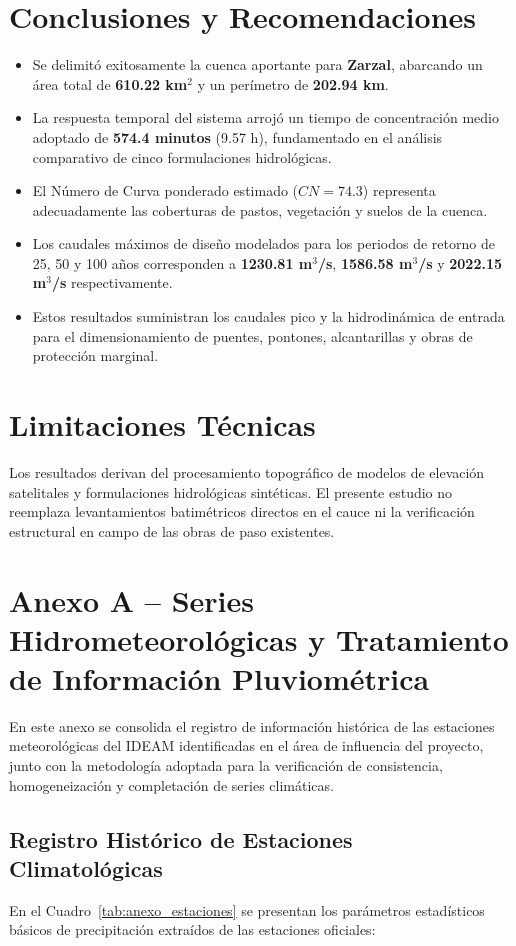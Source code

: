 \documentclass[11pt,a4paper]{article}
\begin{document}
\section{Conclusiones y Recomendaciones}
\begin{itemize}
\item Se delimitó exitosamente la cuenca aportante para \textbf{Zarzal}, abarcando un área total de \textbf{610.22 km$^2$} y un perímetro de \textbf{202.94 km}.
\item La respuesta temporal del sistema arrojó un tiempo de concentración medio adoptado de \textbf{574.4 minutos} (9.57 h), fundamentado en el análisis comparativo de cinco formulaciones hidrológicas.
\item El Número de Curva ponderado estimado ($CN = 74.3$) representa adecuadamente las coberturas de pastos, vegetación y suelos de la cuenca.
\item Los caudales máximos de diseño modelados para los periodos de retorno de 25, 50 y 100 años corresponden a \textbf{1230.81 m$^3$/s}, \textbf{1586.58 m$^3$/s} y \textbf{2022.15 m$^3$/s} respectivamente.
\item Estos resultados suministran los caudales pico y la hidrodinámica de entrada para el dimensionamiento de puentes, pontones, alcantarillas y obras de protección marginal.
\end{itemize}

\section{Limitaciones Técnicas}
Los resultados derivan del procesamiento topográfico de modelos de elevación satelitales y formulaciones hidrológicas sintéticas. El presente estudio no reemplaza levantamientos batimétricos directos en el cauce ni la verificación estructural en campo de las obras de paso existentes.

\newpage
\section{Anexo A -- Series Hidrometeorológicas y Tratamiento de Información Pluviométrica}
En este anexo se consolida el registro de información histórica de las estaciones meteorológicas del IDEAM identificadas en el área de influencia del proyecto, junto con la metodología adoptada para la verificación de consistencia, homogeneización y completación de series climáticas.

\subsection*{Registro Histórico de Estaciones Climatológicas}
En el Cuadro~\ref{tab:anexo_estaciones} se presentan los parámetros estadísticos básicos de precipitación extraídos de las estaciones oficiales:
\end{document}

